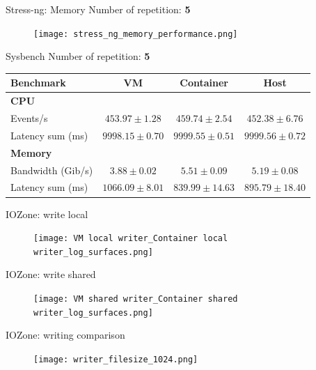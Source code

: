 \documentclass[10pt]{beamer}
\begin{document}
\begin{frame}{Stress-ng: Memory}
  Number of repetition: \textbf{5}
  \begin{figure}
    \centering
    \texttt{[image: stress\_ng\_memory\_performance.png]}
  \end{figure}
\end{frame}


\begin{frame}{Sysbench}
  Number of repetition: \textbf{5}
  \begin{table}[htbp]
    \centering
    \footnotesize
    \begin{tabular}{lccc}
    \toprule
    \textbf{Benchmark} & \textbf{VM} & \textbf{Container} & \textbf{Host} \\
    \midrule
    \textbf{CPU} & & & \\
    Events/s & $453.97 \pm 1.28$ & $459.74 \pm 2.54$ & $452.38 \pm 6.76$ \\
    Latency sum (ms) & $9998.15 \pm 0.70$ & $9999.55 \pm 0.51$ & $9999.56 \pm 0.72$ \\
    \midrule
    \textbf{Memory} & & & \\
    Bandwidth (Gib/s) & $3.88 \pm 0.02$ & $\mathbf{5.51 \pm 0.09}$ & $5.19 \pm 0.08$ \\
    Latency sum (ms) & $1066.09 \pm 8.01$ & $\mathbf{839.99 \pm 14.63}$ & $895.79 \pm 18.40$ \\
    \bottomrule
    \end{tabular}
\end{table}
\end{frame}

\begin{frame}{IOZone: write local}
  \begin{figure}
    \centering
    \texttt{[image: VM local writer\_Container local writer\_log\_surfaces.png]}
  \end{figure}
\end{frame}

\begin{frame}{IOZone: write shared}
  \begin{figure}
    \centering
    \texttt{[image: VM shared writer\_Container shared writer\_log\_surfaces.png]}
  \end{figure}
\end{frame}

\begin{frame}{IOZone: writing comparison}
  \begin{figure}
    \centering
    \texttt{[image: writer\_filesize\_1024.png]}
  \end{figure}
\end{frame}
\end{document}
